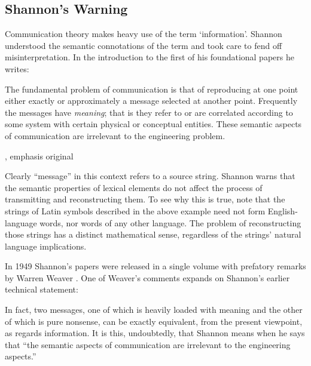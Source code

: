 \documentclass[12pt]{article}
\begin{document}
\subsection{Shannon's Warning}\label{subsec:warning}

Communication theory makes heavy use of the term `information'.
Shannon understood the semantic connotations of the term and took care to fend off misinterpretation.
In the introduction to the first of his foundational papers he writes:

\begin{myquote}
The fundamental problem of communication is that of reproducing at one point either exactly or approximately a message selected at another point. Frequently the messages have \emph{meaning}; that is they refer to or are correlated according to some system with certain physical or conceptual entities. These semantic aspects of communication are irrelevant to the engineering problem.
\par\hspace*{\fill}\citet[379]{shannon1948mathematicalc}, emphasis original
\end{myquote}

\noindent Clearly ``message'' in this context refers to a source string.
Shannon warns that the semantic properties of lexical elements do not affect the process of transmitting and reconstructing them.
To see why this is true, note that the strings of Latin symbols described in the above example need not form English-language words, nor words of any other language.
The problem of reconstructing those strings has a distinct mathematical sense, regardless of the strings' natural language implications.

In 1949 Shannon's papers were released in a single volume with prefatory remarks by Warren Weaver \citep{shannon1949mathematical}.
One of Weaver's comments expands on Shannon's earlier technical statement:

\begin{myquote}
In fact, two messages, one of which is heavily loaded with meaning and the other of which is pure nonsense, can be exactly equivalent, from the present viewpoint, as regards information. It is this, undoubtedly, that Shannon means when he says that ``the semantic aspects of communication are irrelevant to the engineering aspects.''
\par\hspace*{\fill}\citet[8]{shannon1949mathematical}
\end{myquote}
\end{document}
